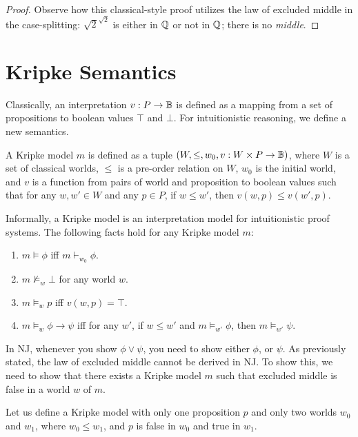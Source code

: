 {{\begin{proof}
  Observe how this classical-style proof utilizes the law of excluded
  middle in the case-splitting: $\sqrt{2} ^ {\sqrt{2}}$ is either in
  $\mathbb{Q}$ or not in $\mathbb{Q}$; there is no \emph{middle}.
\end{proof}

\section{Kripke Semantics}

Classically, an interpretation $v: P \to \mathbb{B}$ is defined as a
mapping from a set of propositions to boolean values $\top$ and
$\bot$. For intuitionistic reasoning, we define a new semantics.

\begin{definition}
  A Kripke model $m$ is defined as a tuple $(W, \leq, w_0,
  v: W \times P \to \mathbb{B})$, where $W$ is a set of classical
  worlds, $\leq$ is a pre-order relation on $W$, $w_0$ is the initial
  world, and $v$ is a function from pairs of world and proposition
  to boolean values such that for any $w, w' \in W$ and any
  $p \in P$, if $w \leq w'$, then $v(w, p) \leq v(w', p)$.
\end{definition}

Informally, a Kripke model is an interpretation model for
intuitionistic proof systems. The following facts hold for any Kripke
model $m$:
\begin{enumerate}
  \item $m \models \phi$ iff $m \vdash_{w_0} \phi$.
  \item $m \not \models_w \bot$ for any world $w$.
  \item $m \models_w p$ iff $v(w, p) = \top$.
  \item $m \models_w \phi \rightarrow \psi$ iff for any $w'$, if
  $w \leq w'$ and $m \models_{w'} \phi$, then $m \models_{w'} \psi$.
\end{enumerate}

In NJ, whenever you show $\phi \lor \psi$, you need to show either
$\phi$, or $\psi$. As previously stated, the law of excluded middle
cannot be derived in NJ. To show this, we need to show that there
exists a Kripke model $m$ such that excluded middle is false in a
world $w$ of $m$.

Let us define a Kripke model with only one proposition $p$ and only
two worlds $w_0$ and $w_1$, where $w_0 \leq w_1$, and $p$ is false in
$w_0$ and true in $w_1$.

\begin{center}
\end{center}

}}
